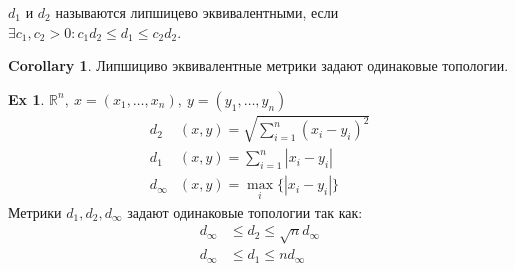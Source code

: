 \documentclass[11pt]{book}
\newcommand{\R}{\mathbb{R}}
\renewcommand{\le}{\leqslant}
\theoremstyle{definition}
\theoremstyle{plain}
\theoremstyle{plain}
\theoremstyle{definition}
\newtheorem*{ex}{Ex}
\newtheorem*{cor}{Corollary}
\theoremstyle{remark}
\begin{document}
\begin{defn}
    $ d_1$ и $ d_2$ называются {\sf липшицево эквивалентными}, если $ \exists c_1, c_2 >0: c_1 d_2 \le  d_1 \le c_2d_2$.
\end{defn}
\begin{cor}
    Липшициво эквивалентные метрики задают одинаковые топологии.
\end{cor}
\begin{ex}
    $ \R^{n} , ~ x=(x_1, \ldots , x_{n}), ~ y=(y_1, \ldots , y_{n})$
    \begin{align*}
	d_2 & (x, y) = \sqrt{\sum_{i=1}^{n} (x_i - y_{i})^2}\\
	d_1 & (x, y) = {\sum_{i=1}^{n} |x_i - y_{i}|}\\
	d_{\infty} & (x, y) = {\max_{i} \{|x_i - y_{i}|\}}
    \end{align*}
Метрики $ d_1, d_2, d_{\infty}$  задают одинаковые топологии так как:
    \begin{align*}
	d_{\infty} & \le d_2 \le \sqrt{n} d_{\infty}\\
	d_{\infty} & \le d_1 \le n d_{\infty}
    \end{align*}
\end{ex}
\end{document}
